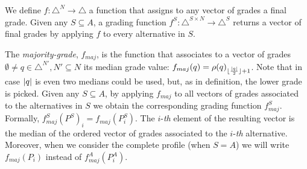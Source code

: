 \documentclass[version=3.21, pagesize, twoside=off, bibliography=totoc, DIV=calc, fontsize=12pt, a4paper]{scrartcl}
\begin{document}
We define $f: \triangle^{N} \rightarrow \triangle$ a function that assigns to any vector of grades a final grade. Given any $S\subseteq A$, a grading function $f^S: \triangle^{S \times N} \rightarrow \triangle^S$ returns a vector of final grades by applying $f$ to every alternative in $S$.

The \emph{majority-grade}, $f_{maj}$, is the function that associates to a vector of grades $\emptyset \neq q \in \triangle^{N'}, N' \subseteq N$ its median grade value: $f_{maj}(q) = \rho(q)_{\lfloor\frac{\lvert q\rvert}{2}\rfloor + 1}$. Note that in case $\lvert q\rvert$ is even two medians could be used, but, as in \citet{Balinski2011} definition, the lower grade is picked. Given any $S\subseteq A$, by applying $f_{maj}$ to all vectors of grades associated to the alternatives in $S$ we obtain the corresponding grading function $f^S_{maj}$. Formally, $f^S_\mathit{maj}(P^S)_i = f_\mathit{maj}(P^S_i)$. The $i$-\emph{th} element of the resulting vector is the median of the ordered vector of grades associated to the $i$-\emph{th} alternative. 
Moreover, when we consider the complete profile (when $S=A$) we will write $f_{maj}(P_i)$ instead of $f^A_{maj}(P^A_i)$.
\end{document}
